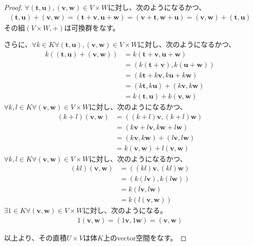 \documentclass[dvipdfmx]{jsarticle}
\begin{document}
\begin{proof}
$\forall\left( \mathbf{t},\mathbf{u} \right),\left( \mathbf{v},\mathbf{w} \right) \in V \times W$に対し、次のようになるかつ、
\begin{align*}
\left( \mathbf{t},\mathbf{u} \right) + \left( \mathbf{v},\mathbf{w} \right) = \left( \mathbf{t} + \mathbf{v},\mathbf{u} + \mathbf{w} \right) = \left( \mathbf{v} + \mathbf{t},\mathbf{w} + \mathbf{u} \right) = \left( \mathbf{v},\mathbf{w} \right) + \left( \mathbf{t},\mathbf{u} \right)
\end{align*}
その組$(V \times W, + )$は可換群をなす。\par
さらに、$\forall k \in K\forall\left( \mathbf{t},\mathbf{u} \right),\left( \mathbf{v},\mathbf{w} \right) \in V \times W$に対し、次のようになるかつ、
\begin{align*}
k\left( \left( \mathbf{t},\mathbf{u} \right) + \left( \mathbf{v},\mathbf{w} \right) \right)&=k\left( \mathbf{t} + \mathbf{v},\mathbf{u} + \mathbf{w} \right)\\
&= \left( k\left( \mathbf{t} + \mathbf{v} \right),k\left( \mathbf{u} + \mathbf{w} \right) \right)\\
&= \left( k\mathbf{t} + k\mathbf{v},k\mathbf{u} + k\mathbf{w} \right)\\
&= \left( k\mathbf{t},k\mathbf{u} \right) + \left( k\mathbf{v},k\mathbf{w} \right)\\
&= k\left( \mathbf{t},\mathbf{u} \right) + k\left( \mathbf{v},\mathbf{w} \right)
\end{align*}
$\forall k,l \in K\forall\left( \mathbf{v},\mathbf{w} \right) \in V \times W$に対し、次のようになるかつ、
\begin{align*}
(k + l)\left( \mathbf{v},\mathbf{w} \right) &= \left( (k + l)\mathbf{v},(k + l)\mathbf{w} \right)\\
&= \left( k\mathbf{v} + l\mathbf{v},k\mathbf{w} + l\mathbf{w} \right)\\
&= \left( k\mathbf{v},k\mathbf{w} \right) + \left( l\mathbf{v},l\mathbf{w} \right)\\
&= k\left( \mathbf{v},\mathbf{w} \right) + l\left( \mathbf{v},\mathbf{w} \right)
\end{align*}
$\forall k,l \in K\forall\left( \mathbf{v},\mathbf{w} \right) \in V \times W$に対し、次のようになるかつ、
\begin{align*}
(kl)\left( \mathbf{v},\mathbf{w} \right) &= \left( (kl)\mathbf{v},(kl)\mathbf{w} \right)\\
&= \left( k\left( l\mathbf{v} \right),k\left( l\mathbf{w} \right) \right)\\
&= k\left( l\mathbf{v},l\mathbf{w} \right)\\
&= k\left( l\left( \mathbf{v},\mathbf{w} \right) \right)
\end{align*}
$\exists 1 \in K\forall\left( \mathbf{v},\mathbf{w} \right) \in V \times W$に対し、次のようになる。
\begin{align*}
1\left( \mathbf{v},\mathbf{w} \right) = \left( 1\mathbf{v},1\mathbf{w} \right) = \left( \mathbf{v},\mathbf{w} \right)
\end{align*}\par
以上より、その直積$U \times V$は体$K$上のvector空間をなす。
\end{proof}
\end{document}
